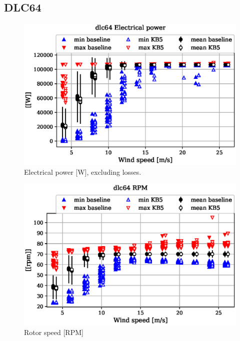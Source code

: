 
\subsection{DLC64}
\label{sec:baseline-vs-KB6:dlc64}

\begin{figure}[!ht]
\begin{center}
	\includegraphics[width=.85\linewidth]{figures/baseline-vs-KB6/dlc64/DLL-generator_servo-inpvec-2_AA0007_AA0003.eps}
\end{center}
\caption{Electrical power [W], excluding losses.}
\label{fig:baseline-vs-KB6:dlc64:power}
\end{figure}

\begin{figure}[!ht]
\begin{center}
	\includegraphics[width=.85\linewidth]{figures/baseline-vs-KB6/dlc64/bearing-shaft_rot-angle_speed-rpm_AA0007_AA0003.eps}
\end{center}
\caption{Rotor speed [RPM]}
\label{fig:baseline-vs-KB6:dlc64:rpm}
\end{figure}

